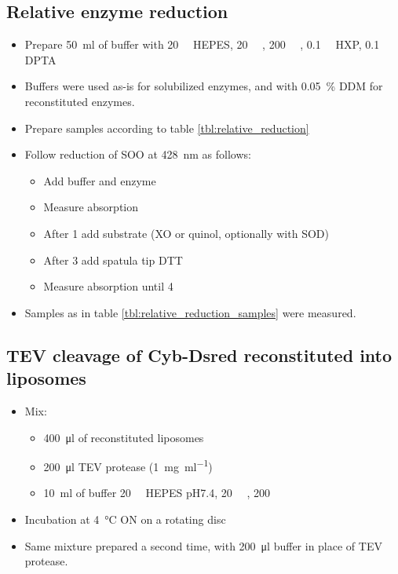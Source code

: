\subsection{Relative enzyme reduction}

\begin{itemize}
	\item Prepare \SI{50}{\ml} of buffer with \SI{20}{\milli\Molar} HEPES,
		\SI{20}{\milli\Molar} , \SI{200}{\milli\Molar}
		, \SI{0.1}{\milli\Molar} HXP, \SI{0.1}{\milli\Molar}
		DPTA
	\item Buffers were used as-is for solubilized enzymes, and with \SI{0.05}{\percent} DDM for reconstituted enzymes.
	\item Prepare samples according to table \ref{tbl:relative_reduction}
	\item Follow reduction of SOO at \SI{428}{\nm} as follows:
		\begin{itemize}
			\item Add buffer and enzyme
			\item Measure absorption
			\item After \SI{1}{\min} add substrate (XO or quinol, optionally with SOD)
			\item After \SI{3}{\min} add spatula tip DTT
			\item Measure absorption until \SI{4}{\min}
		\end{itemize}
	\item Samples as in table \ref{tbl:relative_reduction_samples} were measured.
\end{itemize}

\subsection{TEV cleavage of Cyb-Dsred reconstituted into liposomes}

\begin{itemize}
	\item Mix:
		\begin{itemize}
			\item \SI{400}{\ul} of reconstituted liposomes 
			\item \SI{200}{\ul} TEV protease (\SI{1}{\mg\per\ml})
			\item \SI{10}{\ml} of buffer \SI{20}{\milli\Molar}
				HEPES pH7.4, \SI{20}{\milli\Molar} ,
				\SI{200}{\milli\Molar} 
		\end{itemize}
	\item Incubation at \SI{4}{\celsius} ON on a rotating disc
	\item Same mixture prepared a second time, with \SI{200}{\ul} buffer in
		place of TEV protease.
\end{itemize}

